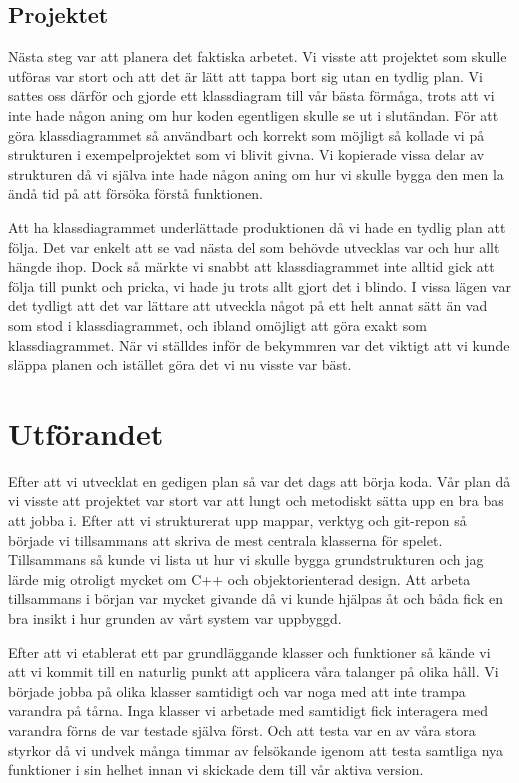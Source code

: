 \documentclass{TDP005mall}
\begin{document}
\subsection{Projektet}
Nästa steg var att planera det faktiska arbetet. Vi visste att projektet som skulle utföras var stort och att det är lätt att tappa bort sig utan en tydlig plan. Vi sattes oss därför och gjorde ett klassdiagram till vår bästa förmåga, trots att vi inte hade någon aning om hur koden egentligen skulle se ut i slutändan. För att göra klassdiagrammet så användbart och korrekt som möjligt så kollade vi på strukturen i exempelprojektet som vi blivit givna. Vi kopierade vissa delar av strukturen då vi själva inte hade någon aning om hur vi skulle bygga den men la ändå tid på att försöka förstå funktionen.

Att ha klassdiagrammet underlättade produktionen då vi hade en tydlig plan att följa. Det var enkelt att se vad nästa del som behövde utvecklas var och hur allt hängde ihop. Dock så märkte vi snabbt att klassdiagrammet inte alltid gick att följa till punkt och pricka, vi hade ju trots allt gjort det i blindo. I vissa lägen var det tydligt att det var lättare att utveckla något på ett helt annat sätt än vad som stod i klassdiagrammet, och ibland omöjligt att göra exakt som klassdiagrammet. När vi ställdes inför de bekymmren var det viktigt att vi kunde släppa planen och istället göra det vi nu visste var bäst.

\section{Utförandet}
Efter att vi utvecklat en gedigen plan så var det dags att börja koda. Vår plan då vi visste att projektet var stort var att lungt och metodiskt sätta upp en bra bas att jobba i. Efter att vi strukturerat upp mappar, verktyg och git-repon så började vi tillsammans att skriva de mest centrala klasserna för spelet. Tillsammans så kunde vi lista ut hur vi skulle bygga grundstrukturen och jag lärde mig otroligt mycket om C++ och objektorienterad design. Att arbeta tillsammans i början var mycket givande då vi kunde hjälpas åt och båda fick en bra insikt i hur grunden av vårt system var uppbyggd.

Efter att vi etablerat ett par grundläggande klasser och funktioner så kände vi att vi kommit till en naturlig punkt att applicera våra talanger på olika håll. Vi började jobba på olika klasser samtidigt och var noga med att inte trampa varandra på tårna. Inga klasser vi arbetade med samtidigt fick interagera med varandra förns de var testade själva först. Och att testa var en av våra stora styrkor då vi undvek många timmar av felsökande igenom att testa samtliga nya funktioner i sin helhet innan vi skickade dem till vår aktiva version.
\end{document}
